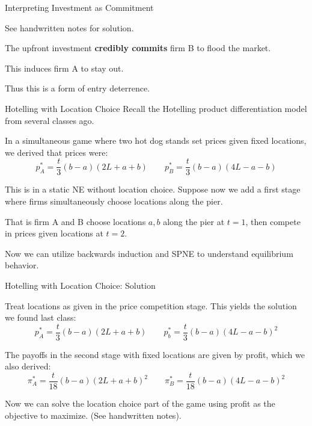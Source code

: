 \documentclass[aspectratio=169]{beamer}
\newenvironment{wideitemize}{\itemize\addtolength{\itemsep}{10pt}}{\enditemize}
\begin{document}
\begin{frame}{Interpreting Investment as Commitment}
\begin{wideitemize}
    \item See handwritten notes for solution.
    \item The upfront investment \textbf{credibly commits} firm B to flood the market.
    \item This induces firm A to stay out.
    \item Thus this is a form of entry deterrence.
\end{wideitemize}
\end{frame}

\begin{frame}{Hotelling with Location Choice}
Recall the Hotelling product differentiation model from several classes ago.
\begin{wideitemize}
    \item In a simultaneous game where two hot dog stands set prices given fixed locations, we derived that prices were:
    \[p^*_A = \frac{t}{3} (b-a)(2L+a+b)\qquad p^*_B =\frac{t}{3} (b-a)(4L-a-b) \]
    \item This is in a static NE without location choice. Suppose now we add a first stage where firms simultaneously choose locations along the pier.
    \item That is firm A and B choose locations $a,b$ along the pier at $t=1$, then compete in prices given locations at $t=2$.
    \item Now we can utilize backwards induction and SPNE to understand equilibrium behavior.
\end{wideitemize}

\end{frame}
\begin{frame}{Hotelling with Location Choice: Solution}
    \begin{wideitemize}
        \item Treat locations as given in the price competition stage. This yields the solution we found last class:
        \[p^*_A = \frac{t}{3} (b-a)(2L+a+b)\qquad p^*_b =\frac{t}{3} (b-a)(4L-a-b)^2 \]
        \item The payoffs in the second stage with fixed locations are given by profit, which we also derived:
        \[\pi^*_A = \frac{t}{18} (b-a)(2L+a+b)^2 \qquad \pi^*_B = \frac{t}{18} (b-a)(4L-a-b)^2\]
        \item Now we can solve the location choice part of the game using profit as the objective to maximize. (See handwritten notes).
    \end{wideitemize}
\end{frame}
\end{document}
